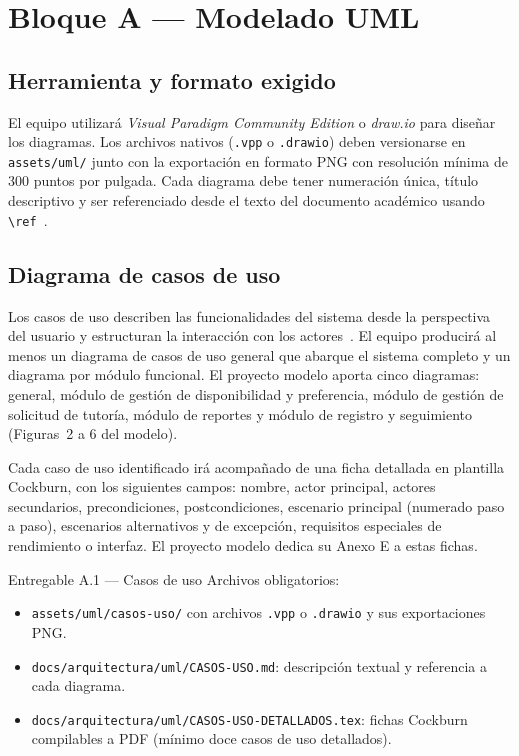 \documentclass[11pt,a4paper]{article}
\begin{document}
\section{Bloque A --- Modelado UML}

\subsection{Herramienta y formato exigido}

El equipo utilizar\'a \emph{Visual Paradigm Community Edition} o \emph{draw.io} para dise\~nar los diagramas. Los archivos nativos (\texttt{.vpp} o \texttt{.drawio}) deben versionarse en \texttt{assets/uml/} junto con la exportaci\'on en formato PNG con resoluci\'on m\'inima de 300 puntos por pulgada. Cada diagrama debe tener numeraci\'on \'unica, t\'itulo descriptivo y ser referenciado desde el texto del documento acad\'emico usando \texttt{\textbackslash ref}~\cite{fowler2018uml,larman2003uml}.

\subsection{Diagrama de casos de uso}

Los casos de uso describen las funcionalidades del sistema desde la perspectiva del usuario y estructuran la interacci\'on con los actores~\cite{cockburn2001usecases,fowler2018uml}. El equipo producir\'a al menos un diagrama de casos de uso general que abarque el sistema completo y un diagrama por m\'odulo funcional. El proyecto modelo aporta cinco diagramas: general, m\'odulo de gesti\'on de disponibilidad y preferencia, m\'odulo de gesti\'on de solicitud de tutor\'ia, m\'odulo de reportes y m\'odulo de registro y seguimiento (Figuras~2 a 6 del modelo).

Cada caso de uso identificado ir\'a acompa\~nado de una ficha detallada en plantilla Cockburn, con los siguientes campos: nombre, actor principal, actores secundarios, precondiciones, postcondiciones, escenario principal (numerado paso a paso), escenarios alternativos y de excepci\'on, requisitos especiales de rendimiento o interfaz. El proyecto modelo dedica su Anexo E a estas fichas.

\begin{cajaentregable}{Entregable A.1 --- Casos de uso}
Archivos obligatorios:
\begin{itemize}
    \item \texttt{assets/uml/casos-uso/} con archivos \texttt{.vpp} o \texttt{.drawio} y sus exportaciones PNG.
    \item \texttt{docs/arquitectura/uml/CASOS-USO.md}: descripci\'on textual y referencia a cada diagrama.
    \item \texttt{docs/arquitectura/uml/CASOS-USO-DETALLADOS.tex}: fichas Cockburn compilables a PDF (m\'inimo doce casos de uso detallados).
\end{itemize}
\end{cajaentregable}
\end{document}
